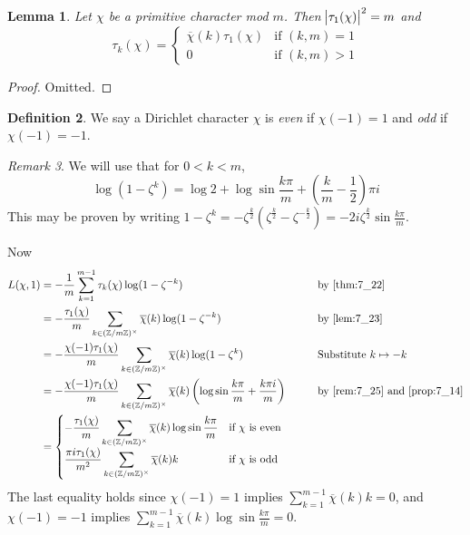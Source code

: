 \documentclass[11pt]{article}
\theoremstyle{definition}
\newtheorem{definition}{Definition}[section]
\theoremstyle{plain}
\newtheorem{lemma}[definition]{Lemma}
\theoremstyle{remark}
\newtheorem{remark}[definition]{Remark}
\newcommand{\ZZ}{\mathbb{Z}}
\begin{document}
\begin{lemma}\label{lem:7_23}
    Let $\chi$ be a primitive character mod $m$. Then $\abs{\tau_1(\chi)}^2 = m$ and
    \begin{equation*}
        \tau_k(\chi) = \begin{cases}
            \overline{\chi}(k) \tau_1(\chi) & \text{if } (k,m)=1\\
            0 & \text{if } (k,m) > 1
        \end{cases}
    \end{equation*}
\end{lemma}
\begin{proof}
    Omitted.
\end{proof}

\begin{definition}\label{def:7_24}
    We say a Dirichlet character $\chi$ is \emph{even} if $\chi(-1) = 1$ and \emph{odd} if $\chi(-1) = -1$.
\end{definition}

\begin{remark}\label{rem:7_25}
    We will use that for $0 < k < m$,
    \begin{equation*}
        \log(1-\zeta^k) = \log 2 + \log \sin \frac{k \pi}{m} + \left(\frac{k}{m} - \frac{1}{2}\right) \pi i
    \end{equation*}
    {\color{blue} This may be proven by writing $1 - \zeta^k = -\zeta^{\frac{k}{2}} (\zeta^{\frac{k}{2}} - \zeta^{-\frac{k}{2}}) = -2i \zeta^{\frac{k}{2}} \sin \frac{k \pi}{m}$.}
\end{remark}
\noindent Now
\begin{alignat*}{3}
    L(\chi, 1)
    &= -\frac{1}{m} \sum_{k=1}^{m-1} \tau_k(\chi) \log(1 - \zeta^{-k}) &&\qquad \text{by \ref{thm:7_22}}\\
    &= -\frac{\tau_1(\chi)}{m} \sum_{k \in (\ZZ / m\ZZ)^\times} \overline{\chi}(k) \log(1 - \zeta^{-k}) &&\qquad \text{by \ref{lem:7_23}}\\
    &= -\frac{\chi(-1) \tau_1(\chi)}{m} \sum_{k \in (\ZZ / m\ZZ)^\times} \overline{\chi}(k) \log(1 - \zeta^k) &&\qquad \text{Substitute } k \mapsto -k\\
    &= -\frac{\chi(-1) \tau_1(\chi)}{m} \sum_{k \in (\ZZ / m\ZZ)^\times} \overline{\chi}(k) \left(\log \sin \frac{k \pi}{m} + \frac{k \pi i}{m}\right) &&\qquad \text{by \ref{rem:7_25} and \ref{prop:7_14}}\\
    &= \begin{cases}
        \displaystyle-\frac{\tau_1(\chi)}{m} \sum_{k \in (\ZZ / m\ZZ)^\times} \overline{\chi}(k) \log \sin \frac{k \pi}{m} & \text{if } \chi \text{ is even}\\
        \displaystyle\frac{\pi i \tau_1(\chi)}{m^2} \sum_{k \in (\ZZ / m\ZZ)^\times} \overline{\chi}(k) k & \text{if } \chi \text{ is odd}
    \end{cases}
\end{alignat*}
The last equality holds since $\chi(-1) = 1$ implies $\sum_{k=1}^{m-1} \overline{\chi}(k) k = 0$, and $\chi(-1) = -1$ implies $\sum_{k=1}^{m-1} \overline{\chi}(k) \log \sin \frac{k \pi}{m} = 0$.
\end{document}
